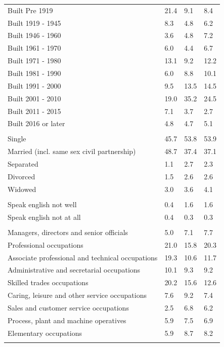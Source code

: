 \documentclass{article}
\begin{document}
\begin{table}[h]
\begin{tabular}{KTTT}
    \hline
Built Pre 1919 & 21.4&  9.1&  8.4\\
Built 1919 - 1945 & 8.3& 4.8& 6.2\\
Built  1946 - 1960 & 3.6& 4.8& 7.2\\
Built  1961 - 1970 & 6.0& 4.4& 6.7\\
Built  1971 - 1980 & 13.1&  9.2& 12.2\\
Built  1981 - 1990 &  6.0&  8.8& 10.1\\
Built  1991 - 2000 &  9.5& 13.5& 14.5\\
Built  2001 - 2010 & 19.0& 35.2& 24.5\\
Built  2011 - 2015 & 7.1& 3.7& 2.7\\
Built  2016 or later & 4.8& 4.7& 5.1\\
\hline
    \\
    \hline
Single & 45.7& 53.8& 53.9\\
Married (incl. same sex civil partnership) & 48.7& 37.4& 37.1\\
Separated  & 1.1& 2.7& 2.3\\
Divorced  & 1.5& 2.6& 2.6\\
Widowed & 3.0& 3.6& 4.1\\
\hline
    \\ 
    \hline
Speak english not well & 0.4& 1.6& 1.6\\
Speak english not at all & 0.4& 0.3& 0.3\\
\hline
    \\
    \hline
Managers, directors and senior officials & 5.0& 7.1& 7.7\\
Professional occupations & 21.0& 15.8& 20.3\\
Associate professional and technical occupations & 19.3& 10.6& 11.7\\
Administrative and secretarial occupations & 10.1&  9.3&  9.2\\
Skilled trades occupations & 20.2& 15.6& 12.6\\
Caring, leisure and other service occupations & 7.6& 9.2& 7.4\\
Sales and customer service occupations & 2.5& 6.8& 6.2\\
Process, plant and machine operatives & 5.9& 7.5& 6.9\\
Elementary occupations & 5.9& 8.7& 8.2\\
\hline
\end{tabular}
\end{table}
\end{document}
